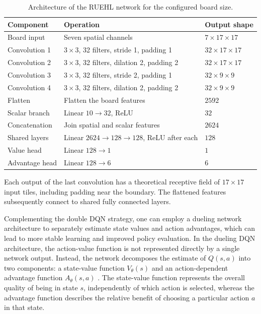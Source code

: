 \documentclass[11pt,a4paper]{article}
\begin{document}
\begin{table}[htbp]
\centering
\small
\begin{tabularx}{\textwidth}{@{}lYl@{}}
\toprule
Component & Operation & Output shape \\
\midrule
Board input & Seven spatial channels & $7\times17\times17$ \\
Convolution 1 & $3\times3$, 32 filters, stride 1, padding 1 & $32\times17\times17$ \\
Convolution 2 & $3\times3$, 32 filters, dilation 2, padding 2 & $32\times17\times17$ \\
Convolution 3 & $3\times3$, 32 filters, stride 2, padding 1 & $32\times9\times9$ \\
Convolution 4 & $3\times3$, 32 filters, dilation 2, padding 2 & $32\times9\times9$ \\
Flatten & Flatten the board features & $2592$ \\
Scalar branch & Linear $10\to32$, ReLU & $32$ \\
Concatenation & Join spatial and scalar features & $2624$ \\
Shared layers & Linear $2624\to128\to128$, ReLU after each & $128$ \\
Value head & Linear $128\to1$ & $1$ \\
Advantage head & Linear $128\to6$ & $6$ \\
\bottomrule
\end{tabularx}
\caption{Architecture of the RUEHL network for the configured board size.}
\label{tab:network}
\end{table}
Each output of the last convolution has a theoretical receptive field of $17\times17$ input tiles, including padding near the boundary. The flattened features subsequently connect to shared fully connected layers.

Complementing the double DQN strategy, one can employ a dueling network architecture to separately estimate state values and action advantages, which can lead to more stable learning and improved policy evaluation.
In the dueling DQN architecture, the action-value function is not represented directly by a single network output. Instead, the network decomposes the estimate of \(Q(s,a)\) into two components: a state-value function \(V_\theta(s)\) and an action-dependent advantage function \(A_\theta(s,a)\) \citep{wang2016dueling}. The state-value function represents the overall quality of being in state \(s\), independently of which action is selected, whereas the advantage function describes the relative benefit of choosing a particular action \(a\) in that state.
\end{document}
